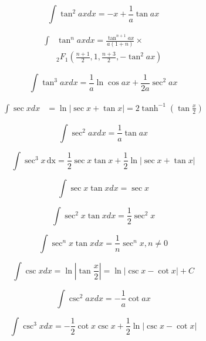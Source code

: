 \documentclass[11pt, letterpaper, notitlepage]{article}
\begin{document}
\begin{multicols}{2}
\begin{footnotesize}
\begin{equation}
\int \tan^2 ax dx = -x + \frac{1}{a} \tan ax 
\end{equation}

\begin{align}
\int &\tan^n ax dx = 
\frac{\tan^{n+1} ax }{a(1+n)} \times \nonumber \\ &
 {_2}F_1\left( \frac{n+1}{2}, 
1, \frac{n+3}{2}, -\tan^2 ax \right) 
\end{align}

\begin{equation}
\int \tan^3 ax dx = \frac{1}{a} \ln \cos ax + \frac{1}{2a}\sec^2 ax 
\end{equation}

\begin{align}
\int \sec x dx &= \ln | \sec x + \tan x | = 2 \tanh^{-1} \left (\tan \frac{x}{2} \right) 
\end{align}

\begin{equation}
\int \sec^2 ax dx = \frac{1}{a} \tan ax 
\end{equation}

\begin{equation}
\int \sec^3 x \hspace{2pt}\text{dx} = \frac{1}{2} \sec x \tan x + \frac{1}{2}\ln | \sec x + \tan x |
\end{equation}

\begin{equation}
\int \sec x \tan x dx = \sec x 
\end{equation}

\begin{equation}
\int \sec^2 x \tan x dx = \frac{1}{2} \sec^2 x 
\end{equation}

\begin{equation}
\int \sec^n x \tan x dx = \frac{1}{n} \sec^n x , n\ne 0
\end{equation}

\begin{equation}
\int \csc x dx = \ln \left | \tan \frac{x}{2} \right|  = \ln | \csc x - \cot x| + C
\end{equation}

\begin{equation}
\int \csc^2 ax dx = -\frac{1}{a} \cot ax 
\end{equation}

\begin{equation}
\int \csc^3 x dx = -\frac{1}{2}\cot x \csc x + \frac{1}{2} \ln | \csc x - \cot x | 
\end{equation}


\end{footnotesize}
\end{multicols}
\end{document}
